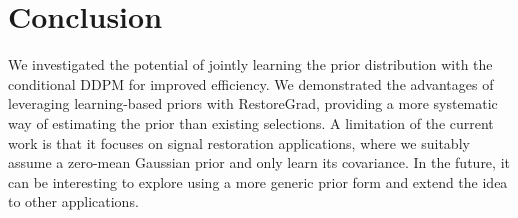 \vspace{-0.15cm}
\section{Conclusion}
\label{sec: conclusion}
\vspace{-0.05cm}
We investigated the potential of jointly learning the prior distribution with the conditional DDPM for improved efficiency. We demonstrated the advantages of leveraging learning-based priors with RestoreGrad, providing a more systematic way of estimating the prior than existing selections. A limitation of the current work is that it focuses on signal restoration applications, where we suitably assume a zero-mean Gaussian prior and only learn its covariance. In the future, it can be interesting to explore using a more generic prior form and extend the idea to other applications.